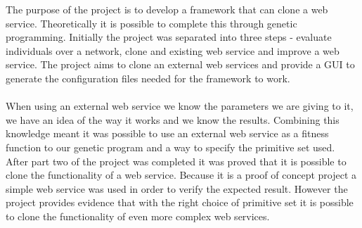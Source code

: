 The purpose of the project is to develop a framework that can clone a web service.
Theoretically it is possible to complete this through genetic programming. Initially the project
was separated into three steps - evaluate individuals over a network, clone and existing web service and improve a
web service. The project aims to clone an external web services and provide a GUI to
generate the configuration files needed for the framework to work.
\paragraph{}
When using an external web service we know the parameters we are giving to it, we have an idea of the way it 
works and we know the results. Combining this knowledge meant it was possible to use an external web service as a fitness
function to our genetic program and a way to specify the primitive set used. After part two of the project
was completed it was proved that it is possible to clone the functionality of a web service. Because it is a proof of concept
project a simple web service was used in order to verify the expected result. However the project provides evidence that with the right
choice of primitive set it is possible to clone the functionality of even more complex web services.